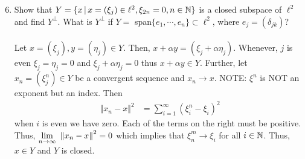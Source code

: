 \documentclass[10pt,a4paper]{report}
\newcommand{\NORM}[1]{\,\left \Vert #1 \right \Vert}
\begin{document}
\begin{enumerate}
	\setcounter{enumi}{5}
	\item Show that $Y=\{x\,|\, x=(\xi_j)\in \ell^2, \xi_{2n}=0, n\in \mathbb{N}\}$ is a closed subspace of $\ell^2$ and find $Y^\perp$.  What is $Y^\perp$ if $Y=$ span$\{e_1,\cdots,e_n\}\subset \ell^2$, where $e_j = (\delta_{jk})$?\\
	\\
	Let $x = (\xi_j), y = (\eta_j) \in Y$.  Then, $x+\alpha y = (\xi_j + \alpha \eta_j)$.  Whenever, $j$ is even $\xi_j = \eta_j=0$ and $\xi_j + \alpha \eta_j = 0$ thus $x+\alpha y \in Y$. Further, let $x_n = (\xi^n_j) \in Y$ be a convergent sequence and $x_n \to x$.  NOTE: $\xi^n$ is NOT an exponent but an index.  Then
	\begin{align*}
		\NORM{x_n-x}^2 &= \sum_{i=1}^\infty (\xi^n_i-\xi_i)^2
	\end{align*}when $i$ is even we have zero.  Each of the terms on the right must be positive.  Thus, $\LIM{n \to \infty} \NORM{x_n -x}^2 = 0$ which implies that $\xi^m_n \to \xi_i$ for all $i\in \mathbb{N}$. Thus, $x \in Y$ and $Y$ is closed.\\
	\\
	

\end{enumerate}
\end{document}
